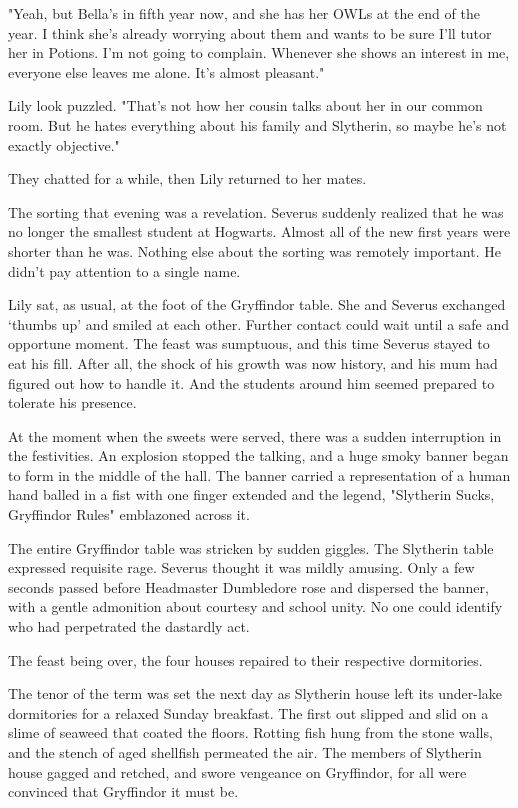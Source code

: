 \documentclass[a4paper,11pt]{article}
\begin{document}
"Yeah, but Bella's in fifth year now, and she has her OWLs at the end of the year. I think she's already worrying about them and wants to be sure I'll tutor her in Potions. I'm not going to complain. Whenever she shows an interest in me, everyone else leaves me alone. It's almost pleasant."

Lily look puzzled. "That's not how her cousin talks about her in our common room. But he hates everything about his family and Slytherin, so maybe he's not exactly objective."

They chatted for a while, then Lily returned to her mates.

The sorting that evening was a revelation. Severus suddenly realized that he was no longer the smallest student at Hogwarts. Almost all of the new first years were shorter than he was. Nothing else about the sorting was remotely important. He didn't pay attention to a single name.

Lily sat, as usual, at the foot of the Gryffindor table. She and Severus exchanged `thumbs up' and smiled at each other. Further contact could wait until a safe and opportune moment. The feast was sumptuous, and this time Severus stayed to eat his fill. After all, the shock of his growth was now history, and his mum had figured out how to handle it. And the students around him seemed prepared to tolerate his presence.

At the moment when the sweets were served, there was a sudden interruption in the festivities. An explosion stopped the talking, and a huge smoky banner began to form in the middle of the hall. The banner carried a representation of a human hand balled in a fist with one finger extended and the legend, "Slytherin Sucks, Gryffindor Rules" emblazoned across it.

The entire Gryffindor table was stricken by sudden giggles. The Slytherin table expressed requisite rage. Severus thought it was mildly amusing. Only a few seconds passed before Headmaster Dumbledore rose and dispersed the banner, with a gentle admonition about courtesy and school unity. No one could identify who had perpetrated the dastardly act.

The feast being over, the four houses repaired to their respective dormitories.

The tenor of the term was set the next day as Slytherin house left its under-lake dormitories for a relaxed Sunday breakfast. The first out slipped and slid on a slime of seaweed that coated the floors. Rotting fish hung from the stone walls, and the stench of aged shellfish permeated the air. The members of Slytherin house gagged and retched, and swore vengeance on Gryffindor, for all were convinced that Gryffindor it must be.
\end{document}
